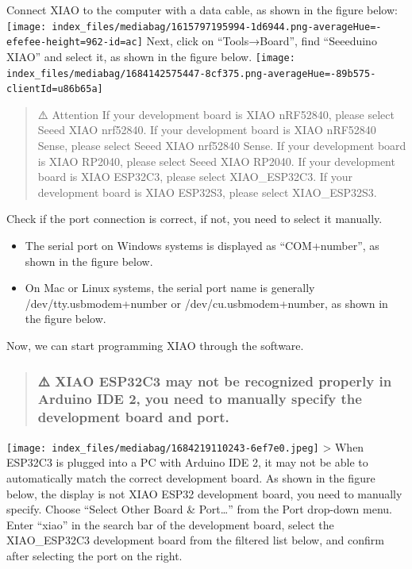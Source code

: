\documentclass[
  letterpaper,
  DIV=11,
  numbers=noendperiod]{scrreprt}
\providecommand{\tightlist}{%
  \setlength{\itemsep}{0pt}\setlength{\parskip}{0pt}}\usepackage{longtable,booktabs,array}
\begin{document}
Connect XIAO to the computer with a data cable, as shown in the figure
below:
\texttt{[image: index\_files/mediabag/1615797195994-1d6944.png-averageHue=-efefee-height=962-id=ac]}
Next, click on ``Tools→Board'', find ``Seeeduino XIAO'' and select it,
as shown in the figure below.
\texttt{[image: index\_files/mediabag/1684142575447-8cf375.png-averageHue=-89b575-clientId=u86b65a]}

\begin{quote}
⚠️ Attention If your development board is XIAO nRF52840, please select
Seeed XIAO nrf52840. If your development board is XIAO nRF52840 Sense,
please select Seeed XIAO nrf52840 Sense. If your development board is
XIAO RP2040, please select Seeed XIAO RP2040. If your development board
is XIAO ESP32C3, please select XIAO\_ESP32C3. If your development board
is XIAO ESP32S3, please select XIAO\_ESP32S3.
\end{quote}

Check if the port connection is correct, if not, you need to select it
manually.

\begin{itemize}
\tightlist
\item
  The serial port on Windows systems is displayed as ``COM+number'', as
  shown in the figure below.
\item
  On Mac or Linux systems, the serial port name is generally
  /dev/tty.usbmodem+number or /dev/cu.usbmodem+number, as shown in the
  figure below.
\end{itemize}

Now, we can start programming XIAO through the software.

\begin{quote}
\hypertarget{xiao-esp32c3-may-not-be-recognized-properly-in-arduino-ide-2-you-need-to-manually-specify-the-development-board-and-port.}{%
\subsubsection*{⚠️ XIAO ESP32C3 may not be recognized properly in
Arduino IDE 2, you need to manually specify the development board and
port.}\label{xiao-esp32c3-may-not-be-recognized-properly-in-arduino-ide-2-you-need-to-manually-specify-the-development-board-and-port.}}
\end{quote}

\texttt{[image: index\_files/mediabag/1684219110243-6ef7e0.jpeg]}
\textgreater{} When ESP32C3 is plugged into a PC with Arduino IDE 2, it
may not be able to automatically match the correct development board. As
shown in the figure below, the display is not XIAO ESP32 development
board, you need to manually specify. Choose ``Select Other Board \&
Port\ldots{}'' from the Port drop-down menu. Enter ``xiao'' in the
search bar of the development board, select the XIAO\_ESP32C3
development board from the filtered list below, and confirm after
selecting the port on the right.
\end{document}
